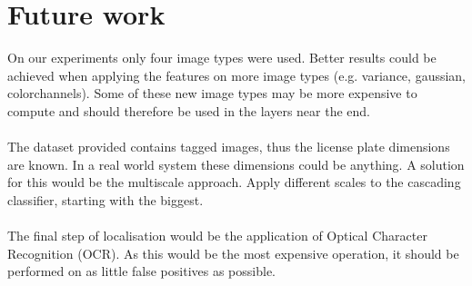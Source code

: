 \documentclass[a4paper,11pt]{article}
\begin{document}
\section{Future work} \label{sec:fut}
On our experiments only four image types were used. Better results could be
achieved when applying the features on more image types (e.g. variance,
gaussian, colorchannels). Some of these new image types may be more expensive
to compute and should therefore be used in the layers near the end. \\\\
The dataset provided contains tagged images, thus the license plate dimensions
are known. In a real world system these dimensions could be anything. A
solution for this would be the multiscale approach. Apply different scales to
the cascading classifier, starting with the biggest.\\\\
The final step of localisation would be the application of Optical Character
Recognition (OCR). As this would be the most expensive operation, it should be
performed on as little false positives as possible.

\renewcommand\bibname{References}


\end{document}
